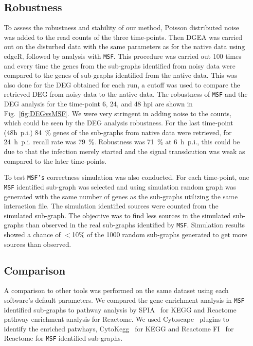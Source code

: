 \documentclass[10pt,a4paper,twocolumn]{article}
\begin{document}
 \subsection*{Robustness}
 
 To assess the robustness and stability of our method, Poisson
 distributed noise was added to the read counts of the three time-points. Then DGEA was
 carried out on the disturbed data with the same parameters as for the
 native data using edgeR, followed by analysis with \texttt{MSF}. This procedure was carried out 100 times
 and every time the genes from the sub-graphs identified from noisy
 data were compared to the genes of sub-graphs identified from the
 native data. This was also done for the DEG obtained for each run, a
 cutoff was used to compare the retrieved DEG from noisy data to the
 native data.  The robustness of \texttt{MSF} and the DEG analysis for
 the time-point 6, 24, and 48 hpi are shown in Fig.~\ref{fig:DEGvsMSF}. We were very stringent in
 adding noise to the counts, which could be seen by the DEG analysis
 robustness. For the last time-point (48h~p.i.) 84~\% genes of the
 sub-graphs from native data were retrieved, for 24~h~p.i. recall rate was
 79~\%. Robustness was 71~\% at 6~h~p.i., this could be due to that the
 infection merely started and the signal transdcution was weak as
 compared to the later time-points.
 
 To test \texttt{MSF's} correctness simulation was also conducted. For each time-point, one \texttt{MSF} identified sub-graph was selected and using simulation random graph was generated with the same number of genes as the sub-graphs utilizing the same interaction file. The simulation identified sources were counted from the simulated sub-graph. The objective
 was to find less sources in the simulated sub-graphs than observed in the real sub-graphs identified by
 \texttt{MSF}. Simulation results showed a chance of $<$10$\%$
 of the 1000 random sub-graphs generated to get more sources than observed.



\subsection*{Comparison}

 A comparison to other tools was performed on the same dataset using each software's default parameters. We compared the gene enrichment analysis in \texttt{MSF} identified
sub-graphs to pathway analysis by SPIA~\cite{Tarca} for KEGG and
Reactome pathway enrichment analysis for Reactome.  We
used Cytoscape~\cite{Cyto} plugins to identify the enriched patwhays,
CytoKegg~\cite{Cytokegg} for KEGG and Reactome FI~\cite{Reactome} for
Reactome for \texttt{MSF} identified
sub-graphs.
\end{document}
